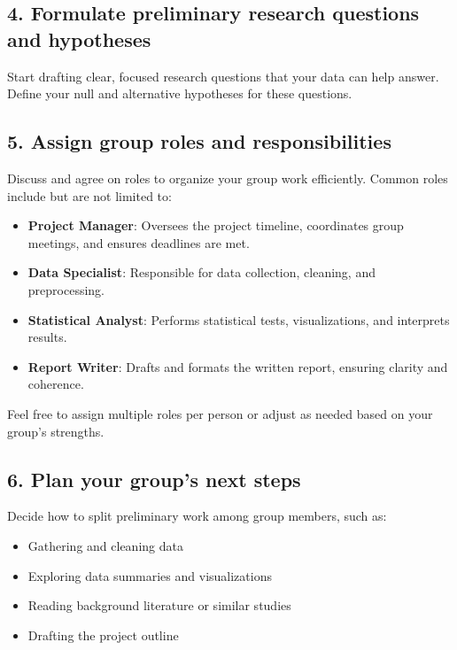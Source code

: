 \documentclass[12pt]{article}
\begin{document}
\vspace{2\baselineskip}

\subsection*{4. Formulate preliminary research questions and hypotheses}
Start drafting clear, focused research questions that your data can help answer.  
Define your null and alternative hypotheses for these questions.

\vspace{3\baselineskip}

\subsection*{5. Assign group roles and responsibilities}

Discuss and agree on roles to organize your group work efficiently.  
Common roles include but are not limited to:  
\begin{itemize}
    \item \textbf{Project Manager}: Oversees the project timeline, coordinates group meetings, and ensures deadlines are met.  
    \item \textbf{Data Specialist}: Responsible for data collection, cleaning, and preprocessing.  
    \item \textbf{Statistical Analyst}: Performs statistical tests, visualizations, and interprets results.  
    \item \textbf{Report Writer}: Drafts and formats the written report, ensuring clarity and coherence.  
\end{itemize}

Feel free to assign multiple roles per person or adjust as needed based on your group’s strengths.

\vspace{2\baselineskip}

\subsection*{6. Plan your group's next steps}

Decide how to split preliminary work among group members, such as:  
\begin{itemize}
    \item Gathering and cleaning data  
    \item Exploring data summaries and visualizations  
    \item Reading background literature or similar studies  
    \item Drafting the project outline  
\end{itemize}
\end{document}
